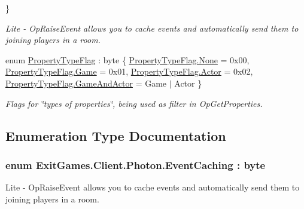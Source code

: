 \begin{DoxyCompactItemize}
 \}\begin{DoxyCompactList}\small\item\em Lite -\/ Op\+Raise\+Event allows you to cache events and automatically send them to joining players in a room. \end{DoxyCompactList}
\item 
enum \hyperlink{namespace_exit_games_1_1_client_1_1_photon_a1eec77036780fdfff47d84b076f448a1}{Property\+Type\+Flag} \+: byte \{ \hyperlink{namespace_exit_games_1_1_client_1_1_photon_a1eec77036780fdfff47d84b076f448a1a6adf97f83acf6453d4a6a4b1070f3754}{Property\+Type\+Flag.\+None} = 0x00, 
\hyperlink{namespace_exit_games_1_1_client_1_1_photon_a1eec77036780fdfff47d84b076f448a1a63d72051e901c069f8aa1b32aa0c43bb}{Property\+Type\+Flag.\+Game} = 0x01, 
\hyperlink{namespace_exit_games_1_1_client_1_1_photon_a1eec77036780fdfff47d84b076f448a1a1cc84619677de81ee6e44149845270a3}{Property\+Type\+Flag.\+Actor} = 0x02, 
\hyperlink{namespace_exit_games_1_1_client_1_1_photon_a1eec77036780fdfff47d84b076f448a1a68ebb8ef1cbd0371b060a93d7788d460}{Property\+Type\+Flag.\+Game\+And\+Actor} = Game $\vert$ Actor
 \}\begin{DoxyCompactList}\small\item\em Flags for \char`\"{}types of properties\char`\"{}, being used as filter in Op\+Get\+Properties. \end{DoxyCompactList}
\end{DoxyCompactItemize}


\subsection{Enumeration Type Documentation}
\subsubsection[{\texorpdfstring{Event\+Caching}{EventCaching}}]{\setlength{\rightskip}{0pt plus 5cm}enum {\bf Exit\+Games.\+Client.\+Photon.\+Event\+Caching} \+: byte\hspace{0.3cm}{\ttfamily [strong]}}\hypertarget{namespace_exit_games_1_1_client_1_1_photon_a854484e793ad0027fa7e3245f9858e53}{}\label{namespace_exit_games_1_1_client_1_1_photon_a854484e793ad0027fa7e3245f9858e53}


Lite -\/ Op\+Raise\+Event allows you to cache events and automatically send them to joining players in a room. 

